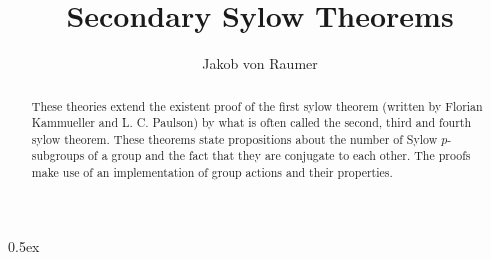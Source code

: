 \documentclass[11pt,a4paper]{article}
\begin{document}
\title{Secondary Sylow Theorems}
\author{Jakob von Raumer}
\maketitle

\begin{abstract}
These theories extend the existent proof of the first sylow theorem (written by Florian Kammueller and L. C. Paulson)
by what is often called the second, third and fourth sylow theorem. These theorems state propositions about the number
of Sylow $p$-subgroups of a group and the fact that they are conjugate to each other. The proofs make use of an implementation
of group actions and their properties.
\end{abstract}

\tableofcontents

\parindent 0pt\parskip 0.5ex


\end{document}
